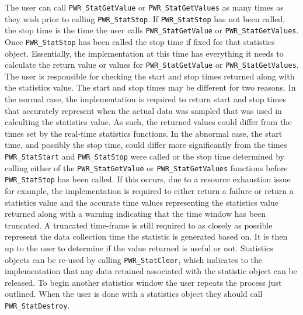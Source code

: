 The user can call \texttt{PWR_StatGetValue} or \texttt{PWR_StatGetValues} as many times as they wish prior to calling \texttt{PWR_StatStop}.
If \texttt{PWR_StatStop} has not been called, the stop time is the time the user calls \texttt{PWR_StatGetValue} or \texttt{PWR_StatGetValues}.
Once \texttt{PWR_StatStop} has been called the stop time if fixed for that statistics object. 
Essentially, the implementation at this time has everything it needs to calculate the return value or values for \texttt{PWR_StatGetValue} or \texttt{PWR_StatGetValues}.
The user is responsible for checking the start and stop times returned along with the statistics value. 
The start and stop times may be different for two reasons.
In the normal case, the implementation is required to return start and stop times that accurately represent when the actual data was sampled that was used in calculting the statistics value.
As such, the returned values could differ from the times set by the real-time statistics functions.
In the abnormal case, the start time, and possibly the stop time, could differ more significantly from the times \texttt{PWR_StatStart} and \texttt{PWR_StatStop} were called or the stop time determined by calling either of the \texttt{PWR_StatGetValue} or \texttt{PWR_StatGetValues} functions before \texttt{PWR_StatStop} has been called. 
If this occurs, due to a resource exhaustion issue for example, the implementation is required to either return a failure or return a statistics value and the accurate time values representing the statistics value returned along with a warning indicating that the time window has been truncated. 
A truncated time-frame is still required to as closely as possible represent the data collection time the statistic is generated based on.
It is then up to the user to determine if the value returned is useful or not.
Statistics objects can be re-used by calling \texttt{PWR_StatClear}, which indicates to the implementation that any data retained associated with the statistic object can be released. 
To begin another statistics window the user repeats the process just outlined.
When the user is done with a statistics object they should call \texttt{PWR_StatDestroy}.

